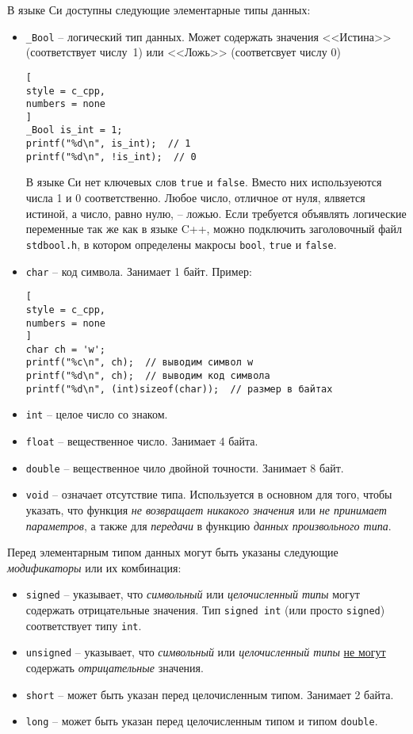 \documentclass[%
	11pt,
	a4paper,
	utf8,
		]{article}
\begin{document}
В языке Си доступны следующие элементарные типы данных:
\begin{itemize}
	\item \verb*|_Bool| -- логический тип данных. Может содержать значения <<Истина>> (соответствует числу~1) или <<Ложь>> (соответсвует числу 0)
\begin{lstlisting}[
style = c_cpp,
numbers = none
]
_Bool is_int = 1;
printf("%d\n", is_int);  // 1
printf("%d\n", !is_int);  // 0
\end{lstlisting}

В языке Си нет ключевых слов \verb|true| и \verb|false|. Вместо них используеются числа 1 и 0 соответственно. Любое число, отличное от нуля, ялвяется истиной, а число, равно нулю, -- ложью. Если требуется объявлять логические переменные так же как в языке C++, можно подключить заголовочный файл \verb|stdbool.h|, в котором определены макросы \verb*|bool|, \verb*|true| и \verb|false|.

\item \verb*|char| -- код символа. Занимает 1 байт. Пример:
\begin{lstlisting}[
style = c_cpp,
numbers = none
]
char ch = 'w';
printf("%c\n", ch);  // выводим символ w
printf("%d\n", ch);  // выводим код символа
printf("%d\n", (int)sizeof(char));  // размер в байтах
\end{lstlisting}

\item \verb|int| -- целое число со знаком.

\item \verb*|float| -- вещественное число. Занимает 4 байта.

\item \verb*|double| -- вещественное чило двойной точности. Занимает 8 байт.

\item \verb|void| -- означает отсутствие типа. Используется в основном для того, чтобы указать, что функция \emph{не возвращает никакого значения} или \emph{не принимает параметров}, а также для \emph{передачи} в функцию \emph{данных произвольного типа}.
\end{itemize}

Перед элементарным типом данных могут быть указаны следующие \emph{модификаторы} или их комбинация:
\begin{itemize}
	\item \verb*|signed| -- указывает, что \emph{символьный} или \emph{целочисленный типы} могут содержать отрицательные значения. Тип \verb*|signed int| (или просто \verb|signed|) соответствует типу \verb*|int|.
	
	\item \verb|unsigned| -- указывает, что \emph{символьный} или \emph{целочисленный типы} \underline{не могут} содержать \emph{отрицательные} значения.
	
	\item \verb|short| -- может быть указан перед целочисленным типом. Занимает 2 байта.
	
	\item \verb*|long| -- может быть указан перед целочисленным типом и типом \verb|double|.
\end{itemize}
\end{document}
